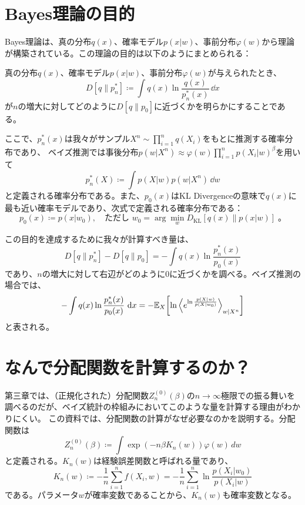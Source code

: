 \documentclass[dvipdfmx]{jsarticle}
\begin{document}
\section{Bayes理論の目的}
Bayes理論は、真の分布$q(x)$、確率モデル$p(x|w)$、事前分布$\varphi(w)$から理論が構築されている。この理論の目的は以下のようにまとめられる：
\begin{mybox}[Bayes理論の目的]
    真の分布$q(x)$、確率モデル$p(x|w)$、事前分布$\varphi(w)$が与えられたとき、
    \begin{equation}
        D[q\parallel p_n^{*}] \coloneqq \int q(x)\ln\frac{q(x)}{p_n^{*}(x)}\,\dd{x}
    \end{equation}
    が$n$の増大に対してどのように$D[q\parallel p_0]$に近づくかを明らかにすることである。

    ここで、$p_{n}^{*}(x)$は我々がサンプル$X^n \sim \prod_{i=1}^{n}q(X_i)$をもとに推測する確率分布であり、
    ベイズ推測では事後分布$p(w|X^n) \approx \varphi(w)\prod_{i=1}^{n}p(X_i|w)^{\beta}$を用いて
    \begin{equation}
        p_{n}^{*}(X) \coloneqq \int p(X|w)p(w|X^n)\,\dd{w}
    \end{equation}
    と定義される確率分布である。また、$p_0(x)$はKL Divergenceの意味で$q(x)$に最も近い確率モデルであり、次式で定義される確率分布である：
    \begin{equation}
        p_0(x) \coloneqq p(x|w_0), \quad \text{ただし } w_0 = \arg\min_{w} D_{\mathrm{KL}}[q(x) \parallel p(x|w)]\;。
    \end{equation}
\end{mybox}
この目的を達成するために我々が計算すべき量は、
\begin{equation}
    D[q\parallel p_n^{*}] - D[q\parallel p_0] = -\int q(x) \ln\frac{p_n^{*}(x)}{p_0(x)}
\end{equation}
であり、$n$の増大に対して右辺がどのように0に近づくかを調べる。ベイズ推測の場合では、
\begin{equation}
    -\int q(x) \ln\frac{p_n^{*}(x)}{p_0(x)}\,\dd{x} = -\mathbb{E}_{X}\qty[\ln \ev{e^{\ln\frac{p(X|w)}{p(X|w_0)}}}_{w|X^n}]
\end{equation}
と表される。



\section{なんで分配関数を計算するのか？}
第三章では、（正規化された）分配関数$Z_n^{(0)}(\beta)$の$n\to\infty$極限での振る舞いを調べるのだが、ベイズ統計の枠組みにおいてこのような量を計算する理由がわかりにくい。
この資料では、分配関数の計算がなぜ必要なのかを説明する。分配関数は
\begin{equation}
    Z_n^{(0)}(\beta) \coloneqq \int\exp(-n\beta K_n(w))\varphi(w)\,dw
\end{equation}
と定義される。$K_n(w)$は経験誤差関数と呼ばれる量であり、
\begin{equation}
    K_n(w) \coloneqq -\frac{1}{n}\sum_{i=1}^n f(X_i, w) = -\frac{1}{n}\sum_{i=1}^n \ln \frac{p(X_i|w_0)}{p(X_i|w)}
\end{equation}
である。パラメータ$w$が確率変数であることから、$K_n(w)$も確率変数となる。
\end{document}
